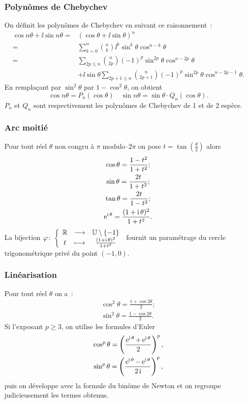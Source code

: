 \subsubsection{Polynômes de Chebychev}
\label{subsubsec:Chebychev}
\begin{defdef}
  On définit les polynômes de Chebychev en suivant ce raisonnement~:
  \begin{align}
    \cos n \theta + \ii \sin n \theta =& (\cos \theta + \ii \sin \theta)^n\\
    =& \sum_{k=0}^n \binom{n}{k} \ii^k \sin^k \theta \cos^{n-k} \theta\\
    =& \sum_{2p \leqslant n} \binom{n}{2p} (-1)^p \sin^{2p} \theta \cos^{n-2p} \theta \\ &+ \ii \sin \theta \sum_{2p +1\leqslant n} \binom{n}{2p+1} (-1)^p \sin^{2p} \theta \cos^{n-2p-1} \theta.
  \end{align}
  En remplaçant par \(\sin^2 \theta\) par \(1-\cos^2 \theta\), on obtient
  \begin{equation}
    \cos n \theta = P_n(\cos \theta) \quad \sin n \theta = \sin \theta \cdot Q_n(\cos \theta).
  \end{equation}
  \(P_n\) et \(Q_n\) sont respectivement les polynômes de Chebychev de 1\iere{} et de 2\ieme{} espèce.
\end{defdef}
%
\subsubsection{Arc moitié}
\label{subsubsec:arcmoitie}
Pour tout réel \(\theta\) non congru à \(\pi\) modulo--\(2\pi\) on pose \(t=\tan \left( \frac{\theta}{2} \right)\) alors
\begin{gather}
  \cos \theta = \dfrac{1-t^2}{1+t^2};\\
  \sin \theta = \dfrac{2t}{1+t^2}; \\
  \tan \theta = \frac{2t}{1-t^2};\\
  \operatorname{e}^{\operatorname{i} \theta}=\frac{(1+\operatorname{i} \theta)^2}{1+t^2}.
\end{gather}
La bijection \(\varphi\colon \left\{\begin{array}{ccc} \mathbb{R} & \longrightarrow &\mathbb{U}\setminus \{-1\}\\ t & \longmapsto & \frac{(1+\operatorname{i} \theta)^2}{1+t^2} \end{array} \right.\) fournit un paramétrage du cercle trigonométrique privé du point \((-1,0)\).
%
\subsubsection{Linéarisation}
\label{subsubsec:linearisation}
Pour tout réel \(\theta\) on a~:
\begin{gather}
  \cos^2 \theta = \frac{1+\cos 2\theta}{2}; \\
  \sin^2 \theta = \frac{1-\cos 2\theta}{2}.
\end{gather}
Si l'exposant \(p \geqslant 3\), on utilise les formules d'Euler
\begin{gather}
  \cos^p \theta = \left(\frac{\operatorname{e}^{\operatorname{i} \theta}+\operatorname{e}^{\operatorname{i} \theta}}{2} \right)^p, \\
  \sin^p \theta = \left(\frac{\operatorname{e}^{\operatorname{i} \theta}-\operatorname{e}^{\operatorname{i} \theta}}{2 \operatorname{i}} \right)^p,
\end{gather}
puis on développe avec la formule du binôme de Newton et on regroupe judicieusement les termes obtenus.
%
